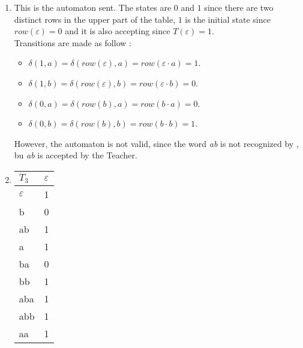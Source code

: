 \begin{enumerate}
  \item \begin{minipage}{0.3\textwidth}
          
        \end{minipage}\quad
        \begin{minipage}{0.6\textwidth}
          This is the automaton sent.
          The states are $0$ and $1$ since there are two distinct rows in the upper part of the table, $1$ is the initial state since $row(\varepsilon) = 0$ and it is also accepting since $T(\varepsilon) = 1$.\\
          Transitions are made as follow : \\
          \begin{itemize}
            \item $\delta(1, a) = \delta(row(\varepsilon), a) = row(\varepsilon \cdot a) = 1$.
            \item $\delta(1, b) = \delta(row(\varepsilon), b) = row(\varepsilon \cdot b) =  0$.
            \item $\delta(0, a) = \delta(row(b), a) = row(b \cdot a) =  0$.
            \item $\delta(0, b) = \delta(row(b), b) = row(b \cdot b) = 1$.
          \end{itemize}
          However, the automaton is not valid, since the word \textit{ab} is not recognized by \automaton{}, bu \textit{ab} is accepted by the Teacher.
        \end{minipage}
  \item \begin{minipage}{0.3\textwidth}
          \begin{tabular}{l||l}
            $T_3$         & $\varepsilon$ \\
            \hline\hline
            $\varepsilon$ & 1             \\
            b             & 0             \\
            ab            & 1             \\
            a             & 1             \\
            \hline\hline
            ba            & 0             \\
            bb            & 1             \\
            aba           & 1             \\
            abb           & 1             \\
            aa            & 1             \\

\end{tabular}
\end{minipage}
\end{enumerate}
